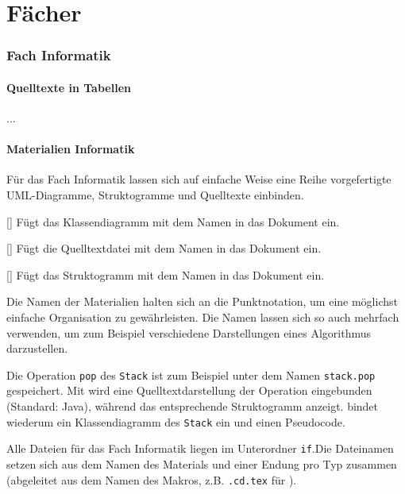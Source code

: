 \part{Fächer}\label{part:faecher}

\section{Fach Informatik}\label{sec:fachinfo}

\subsection{Quelltexte in Tabellen}
...

\subsection{Materialien Informatik}\label{sec:materialinfo}
Für das Fach Informatik lassen sich auf einfache Weise eine Reihe vorgefertigte UML-Diagramme, Struktogramme und Quelltexte einbinden.

\begin{commands}
	[]
	Fügt das Klassendiagramm mit dem Namen  in das Dokument ein.
	
	[]
	Fügt die Quelltextdatei mit dem Namen  in das Dokument ein.
	
	[]
	Fügt das Struktogramm mit dem Namen  in das Dokument ein.
\end{commands}

Die Namen der Materialien halten sich an die Punktnotation, um eine möglichst einfache Organisation zu gewährleisten. Die Namen lassen sich so auch mehrfach verwenden, um zum Beispiel verschiedene Darstellungen eines Algorithmus darzustellen.

Die Operation \texttt{pop} des \texttt{Stack} ist zum Beispiel unter dem Namen \texttt{stack.pop} gespeichert. Mit  wird eine Quelltextdarstellung der Operation eingebunden (Standard: Java), während  das entsprechende Struktogramm anzeigt.  bindet wiederum ein Klassendiagramm des \texttt{Stack} ein und  einen Pseudocode.

Alle Dateien für das Fach Informatik liegen im Unterordner \texttt{if}.Die Dateinamen setzen sich aus dem Namen des Materials und einer Endung pro Typ zusammen (abgeleitet aus dem Namen des Makros, z.B. \texttt{.cd.tex} für ).

